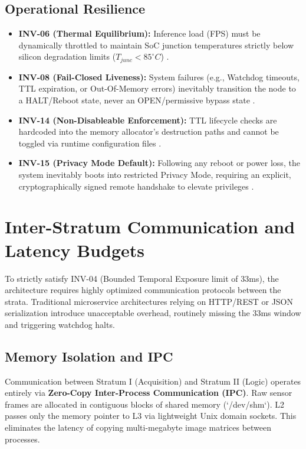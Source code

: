 \documentclass[conference]{IEEEtran}
\theoremstyle{definition}
\begin{document}
\subsection{Operational Resilience}
\begin{itemize}
    \item \textbf{INV-06 (Thermal Equilibrium):} Inference load (FPS) must be dynamically throttled to maintain SoC junction temperatures strictly below silicon degradation limits ($T_{junc} < 85^{\circ}C$) \cite{P5, P11}.
    \item \textbf{INV-08 (Fail-Closed Liveness):} System failures (e.g., Watchdog timeouts, TTL expiration, or Out-Of-Memory errors) inevitably transition the node to a HALT/Reboot state, never an OPEN/permissive bypass state \cite{P11}.
    \item \textbf{INV-14 (Non-Disableable Enforcement):} TTL lifecycle checks are hardcoded into the memory allocator's destruction paths and cannot be toggled via runtime configuration files \cite{P18}.
    \item \textbf{INV-15 (Privacy Mode Default):} Following any reboot or power loss, the system inevitably boots into restricted Privacy Mode, requiring an explicit, cryptographically signed remote handshake to elevate privileges \cite{P11}.
\end{itemize}

\section{Inter-Stratum Communication and Latency Budgets}
To strictly satisfy INV-04 (Bounded Temporal Exposure limit of 33ms), the architecture requires highly optimized communication protocols between the strata. Traditional microservice architectures relying on HTTP/REST or JSON serialization introduce unacceptable overhead, routinely missing the 33ms window and triggering watchdog halts.

\subsection{Memory Isolation and IPC}
Communication between Stratum I (Acquisition) and Stratum II (Logic) operates entirely via \textbf{Zero-Copy Inter-Process Communication (IPC)}. Raw sensor frames are allocated in contiguous blocks of shared memory (`/dev/shm`). L2 passes only the memory pointer to L3 via lightweight Unix domain sockets. This eliminates the latency of copying multi-megabyte image matrices between processes.
\end{document}
